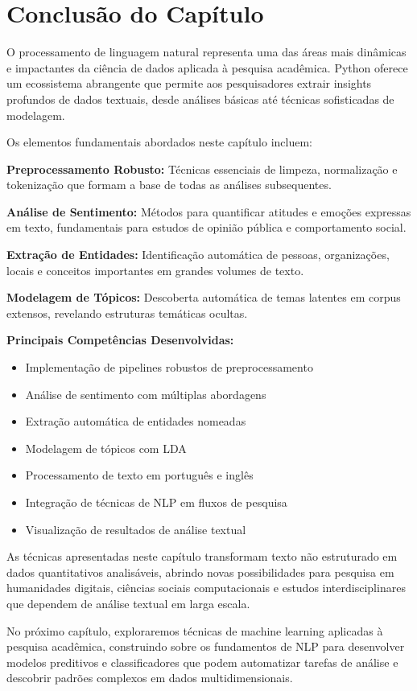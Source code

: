 \section{Conclusão do Capítulo}

O processamento de linguagem natural representa uma das áreas mais dinâmicas e impactantes da ciência de dados aplicada à pesquisa acadêmica. Python oferece um ecossistema abrangente que permite aos pesquisadores extrair insights profundos de dados textuais, desde análises básicas até técnicas sofisticadas de modelagem.

Os elementos fundamentais abordados neste capítulo incluem:

\textbf{Preprocessamento Robusto:} Técnicas essenciais de limpeza, normalização e tokenização que formam a base de todas as análises subsequentes.

\textbf{Análise de Sentimento:} Métodos para quantificar atitudes e emoções expressas em texto, fundamentais para estudos de opinião pública e comportamento social.

\textbf{Extração de Entidades:} Identificação automática de pessoas, organizações, locais e conceitos importantes em grandes volumes de texto.

\textbf{Modelagem de Tópicos:} Descoberta automática de temas latentes em corpus extensos, revelando estruturas temáticas ocultas.

\begin{examplebox}
\textbf{Principais Competências Desenvolvidas:}
\begin{itemize}
    \item Implementação de pipelines robustos de preprocessamento
    \item Análise de sentimento com múltiplas abordagens
    \item Extração automática de entidades nomeadas
    \item Modelagem de tópicos com LDA
    \item Processamento de texto em português e inglês
    \item Integração de técnicas de NLP em fluxos de pesquisa
    \item Visualização de resultados de análise textual
\end{itemize}
\end{examplebox}

As técnicas apresentadas neste capítulo transformam texto não estruturado em dados quantitativos analisáveis, abrindo novas possibilidades para pesquisa em humanidades digitais, ciências sociais computacionais e estudos interdisciplinares que dependem de análise textual em larga escala.

No próximo capítulo, exploraremos técnicas de machine learning aplicadas à pesquisa acadêmica, construindo sobre os fundamentos de NLP para desenvolver modelos preditivos e classificadores que podem automatizar tarefas de análise e descobrir padrões complexos em dados multidimensionais.